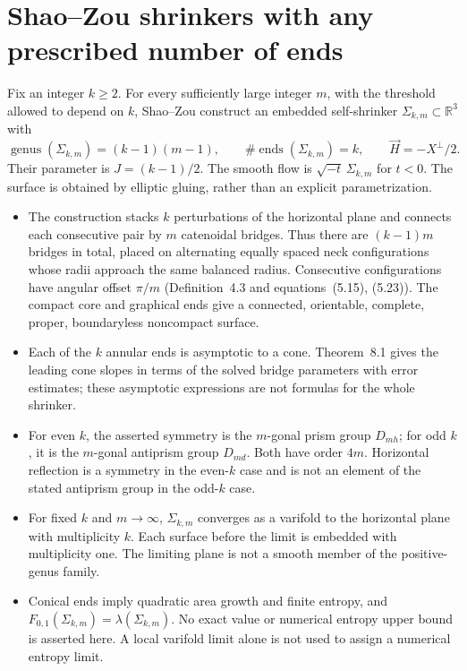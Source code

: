 \chapter{Shao--Zou shrinkers with any prescribed number of ends}\label{sec:catalogue-shao-zou-stacking}
\begin{example}\label{ex:catalogue-shao-zou-stacking}
Fix an integer $k\geq2$. For every sufficiently large integer $m$, with the threshold allowed to depend on $k$, Shao--Zou construct an embedded self-shrinker $\Sigma_{k,m}\subset\mathbb R^3$ with
\[
 \operatorname{genus}(\Sigma_{k,m})=(k-1)(m-1),\qquad
 \#\operatorname{ends}(\Sigma_{k,m})=k,
 \qquad \vec H=-X^\perp/2.
\]
Their parameter is $J=(k-1)/2$. The smooth flow is $\sqrt{-t}\,\Sigma_{k,m}$ for $t<0$. The surface is obtained by elliptic gluing, rather than an explicit parametrization.
\begin{itemize}
\item The construction stacks $k$ perturbations of the horizontal plane and connects each consecutive pair by $m$ catenoidal bridges. Thus there are $(k-1)m$ bridges in total, placed on alternating equally spaced neck configurations whose radii approach the same balanced radius. Consecutive configurations have angular offset $\pi/m$ (Definition~4.3 and equations~(5.15), (5.23)). The compact core and graphical ends give a connected, orientable, complete, proper, boundaryless noncompact surface.
\item Each of the $k$ annular ends is asymptotic to a cone. Theorem~8.1 gives the leading cone slopes in terms of the solved bridge parameters with error estimates; these asymptotic expressions are not formulas for the whole shrinker.
\item For even $k$, the asserted symmetry is the $m$-gonal prism group $D_{mh}$; for odd $k$, it is the $m$-gonal antiprism group $D_{md}$. Both have order $4m$. Horizontal reflection is a symmetry in the even-$k$ case and is not an element of the stated antiprism group in the odd-$k$ case.
\item For fixed $k$ and $m\to\infty$, $\Sigma_{k,m}$ converges as a varifold to the horizontal plane with multiplicity $k$. Each surface before the limit is embedded with multiplicity one. The limiting plane is not a smooth member of the positive-genus family.
\item Conical ends imply quadratic area growth and finite entropy, and $F_{0,1}(\Sigma_{k,m})=\lambda(\Sigma_{k,m})$. No exact value or numerical entropy upper bound is asserted here. A local varifold limit alone is not used to assign a numerical entropy limit.

\end{itemize}
\end{example}
